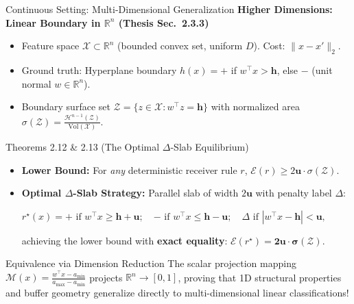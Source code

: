 \documentclass[aspectratio=169, 11pt, t, xcolor=table]{beamer}
\newcommand{\R}{\mathbb{R}}
\newcommand{\cg}[1]{\mathcal{#1}}
\newcommand{\hh}{\mathbf{h}}
\newcommand{\uu}{\mathbf{u}}
\newcommand{\minus}{\mathbf{-}}
\newcommand{\plus}{\mathbf{+}}
\newcommand{\rs}{r^{\star}}
\begin{document}
\begin{frame}{Continuous Setting: Multi-Dimensional Generalization}
\small
\textbf{Higher Dimensions: Linear Boundary in $\R^n$ (Thesis Sec.\ 2.3.3)}
\begin{itemize}\itemsep=0.5pt
  \footnotesize
  \item Feature space $\cg{X} \subset \R^n$ (bounded convex set, uniform $D$). Cost: $\|x - x'\|_2$.
  \item Ground truth: Hyperplane boundary $h(x) = \plus$ if $w^\top x > \hh$, else $\minus$ (unit normal $w \in \R^n$).
  \item Boundary surface set $\cg{Z} = \{z \in \cg{X} : w^\top z = \hh\}$ with normalized area $\sigma(\cg{Z}) = \frac{\mathcal{H}^{n-1}(\cg{Z})}{\text{Vol}(\cg{X})}$.
\end{itemize}

\vspace{0.05em}
\begin{block}{Theorems 2.12 \& 2.13 (The Optimal $\Delta$-Slab Equilibrium)}
\footnotesize
\begin{itemize}\itemsep=0.5pt
  \item \textbf{Lower Bound:} For \emph{any} deterministic receiver rule $r$, $\cg{E}(r) \ge 2\uu \cdot \sigma(\cg{Z})$.
  \item \textbf{Optimal $\Delta$-Slab Strategy:} Parallel slab of width $2\uu$ with penalty label $\Delta$:
  \begin{center}
  \vspace{-0.4em}
  $\rs(x) = \plus \text{ if } w^\top x \ge \hh+\uu; \quad \minus \text{ if } w^\top x \le \hh-\uu; \quad \Delta \text{ if } |w^\top x - \hh| < \uu,$
  \vspace{-0.4em}
  \end{center}
  achieving the lower bound with \textbf{exact equality}: $\cg{E}(\rs) = \mathbf{2\uu \cdot \sigma(\cg{Z})}$.
\end{itemize}
\end{block}

\vspace{0.05em}
\begin{alertblock}{Equivalence via Dimension Reduction}
\scriptsize
The scalar projection mapping $\cg{M}(x) = \frac{w^\top x - a_{\min}}{a_{\max} - a_{\min}}$ projects $\R^n \to [0,1]$, proving that 1D structural properties and buffer geometry generalize directly to multi-dimensional linear classifications!
\end{alertblock}
\end{frame}
\end{document}
